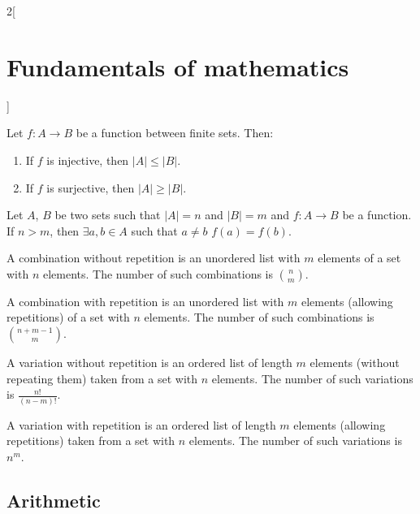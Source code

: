\documentclass[../../../main.tex]{subfiles}
\begin{document}
\begin{multicols}{2}[\section{Fundamentals of mathematics}]
\begin{prop}
  \end{prop}
  \begin{corollary}
    Let $f:A\rightarrow B$ be a function between finite sets. Then:
    \begin{enumerate}
      \item If $f$ is injective, then $|A|\leq|B|$.
      \item If $f$ is surjective, then $|A|\geq|B|$.
    \end{enumerate}
  \end{corollary}
  \begin{theorem}
    Let $A$, $B$ be two sets such that $|A|=n$ and $|B|=m$ and $f:A\rightarrow B$ be a function. If $n>m$, then $\exists a,b\in A$ such that $a\ne b$ $f(a)=f(b)$.
  \end{theorem}
  \begin{prop}
    A combination without repetition is an unordered list with $m$ elements of a set with $n$ elements. The number of such combinations is $\binom{n}{m}$.
  \end{prop}
  \begin{prop}
    A combination with repetition is an unordered list with $m$ elements (allowing repetitions) of a set with $n$ elements. The number of such combinations is  $\binom{n+m-1}{m}$.
  \end{prop}
  \begin{prop}
    A variation without repetition is an ordered list of length $m$ elements (without repeating them) taken from a set with $n$ elements. The number of such variations is $\frac{n!}{(n-m)!}$.
  \end{prop}
  \begin{prop}
    A variation with repetition is an ordered list of length $m$ elements (allowing repetitions) taken from a set with $n$ elements. The number of such variations is $n^m$.
  \end{prop}
  \subsection{Arithmetic}

\end{multicols}
\end{document}
